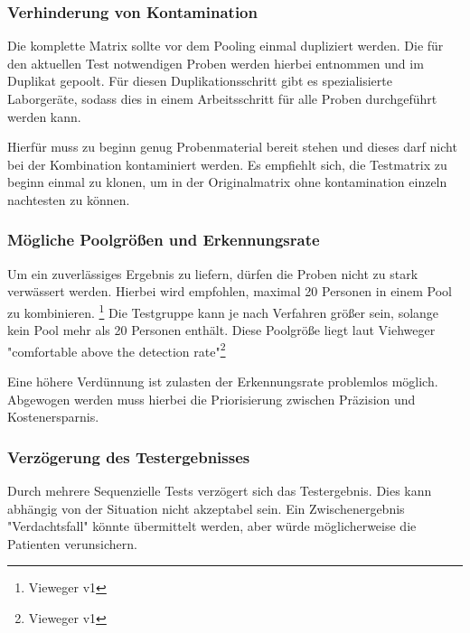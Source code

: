 \subsubsection{Verhinderung von Kontamination}
Die komplette Matrix sollte vor dem Pooling einmal dupliziert werden. 
Die für den aktuellen Test notwendigen Proben werden hierbei entnommen und im Duplikat gepoolt.
Für diesen Duplikationsschritt gibt es spezialisierte Laborgeräte, sodass dies in einem Arbeitsschritt für alle Proben durchgeführt werden kann.

Hierfür muss zu beginn genug Probenmaterial bereit stehen und dieses darf nicht bei der Kombination kontaminiert werden.
Es empfiehlt sich, die Testmatrix zu beginn einmal zu klonen, um in der Originalmatrix ohne kontamination einzeln nachtesten zu können.

\subsubsection{Mögliche Poolgrößen und Erkennungsrate}
Um ein zuverlässiges Ergebnis zu liefern, dürfen die Proben nicht zu stark verwässert werden.
Hierbei wird empfohlen, maximal 20 Personen in einem Pool zu kombinieren. \footnote{Vieweger v1}
Die Testgruppe kann je nach Verfahren größer sein, solange kein Pool mehr als 20 Personen enthält.
Diese Poolgröße liegt laut Viehweger "comfortable above the detection rate"\footnote{Vieweger v1}

Eine höhere Verdünnung ist zulasten der Erkennungsrate problemlos möglich.
Abgewogen werden muss hierbei die Priorisierung zwischen Präzision und Kostenersparnis.

\subsubsection{Verzögerung des Testergebnisses}
Durch mehrere Sequenzielle Tests verzögert sich das Testergebnis.
Dies kann abhängig von der Situation nicht akzeptabel sein.
Ein Zwischenergebnis "Verdachtsfall" könnte übermittelt werden, aber würde möglicherweise die Patienten verunsichern.

